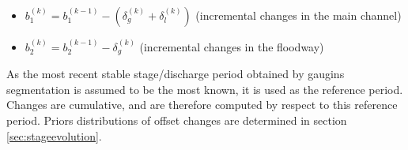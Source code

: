 \documentclass[11pt]{article}
\begin{document}
       \begin{itemize}
            \item $b_1^{(k)} = b_1^{(k-1)}-(\delta_g^{(k)}+\delta_l^{(k)})$ (incremental changes in the main channel)
            \item $b_2^{(k)} = b_2^{(k-1)}-\delta_g^{(k)}$ (incremental changes in the floodway)
       \end{itemize}
       
       As the most recent stable stage/discharge period obtained by gaugins segmentation is assumed to be the most known, it is used as the reference period. Changes are cumulative, and are therefore computed by respect to this reference period. Priors distributions of offset changes are determined in section \ref{sec:stageevolution}.
       
       
\end{document}

